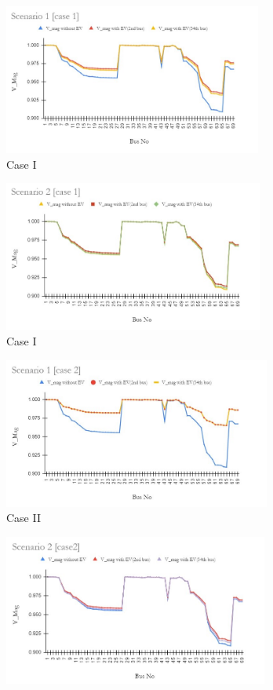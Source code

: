 \begin{figure}[!h]
	\begin{subfigure}{.5\textwidth}
		\centering
		\includegraphics[width=.97\linewidth,height= 4.95cm]{./Figures/69_sc1_case1}  
		\caption{Case I}
		\label{fig:RFa}
	\end{subfigure}
	\begin{subfigure}{.5\textwidth}
		\centering
		\includegraphics[width=.97\linewidth,height= 4.95cm]{./Figures/69_sc2_case1}  
		\caption{Case I}
		\label{fig:RF2a}
	\end{subfigure}
	\begin{subfigure}{.5\textwidth}
		\centering
		\includegraphics[width=.97\linewidth,height= 4.95cm]{./Figures/69_sc1_case2}
		\caption{Case II}
		\label{fig:RFb}
	\end{subfigure}
	\begin{subfigure}{.5\textwidth}
		\centering
		\includegraphics[width=.97\linewidth,height= 4.95cm]{./Figures/69_sc2_case2}

\end{subfigure}
\end{figure}
